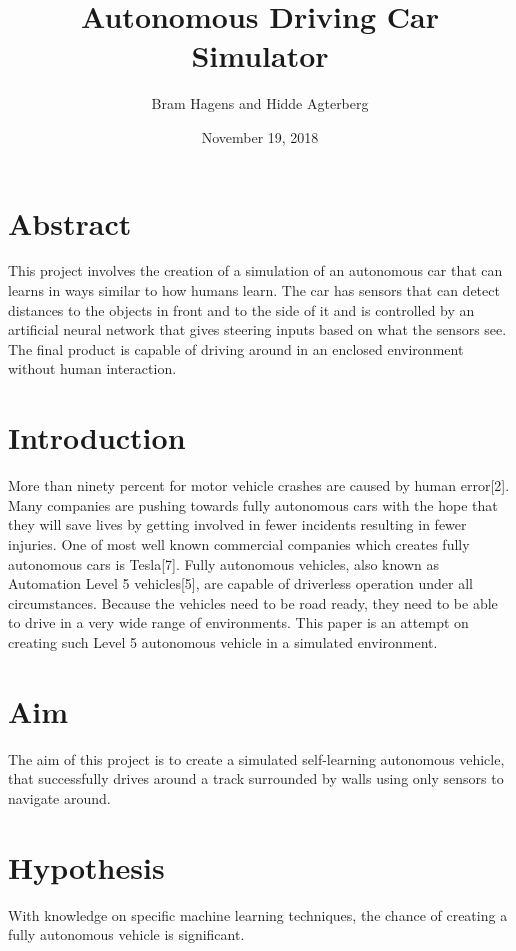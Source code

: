 \documentclass{article}
\begin{document}
\title{Autonomous Driving Car Simulator}
\author{Bram Hagens and Hidde Agterberg}
\date{November 19, 2018}
\maketitle
\newpage

\tableofcontents
\newpage

\section{Abstract}
This project involves the creation of a simulation of an autonomous car that can learns in ways similar to how humans learn. The car has sensors that can detect distances to the objects in front and to the side of it and is controlled by an artificial neural network that gives steering inputs based on what the sensors see. The final product is capable of driving around in an enclosed environment without human interaction.
\newpage

\section{Introduction}
More than ninety percent for motor vehicle crashes are caused by human error[2]. Many companies are pushing towards fully autonomous cars with the hope that they will save lives by getting involved in fewer incidents resulting in fewer injuries. One of most well known commercial companies which creates fully autonomous cars is Tesla[7]. Fully autonomous vehicles, also known as Automation Level 5 vehicles[5], are capable of driverless operation under all circumstances. Because the vehicles need to be road ready, they need to be able to drive in a very wide range of environments. This paper is an attempt on creating such Level 5 autonomous vehicle in a simulated environment.

\section{Aim}
The aim of this project is to create a simulated self-learning autonomous vehicle, that successfully drives around a track surrounded by walls using only sensors to navigate around.

\section{Hypothesis}
With knowledge on specific machine learning techniques, the chance of creating a fully autonomous vehicle is significant. 
\end{document}
